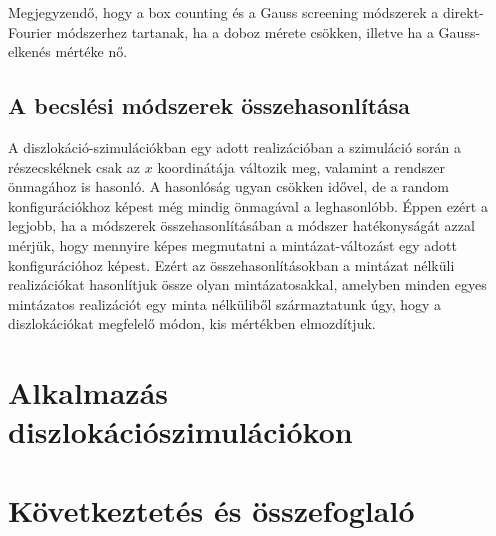 \documentclass[10pt,a4paper]{scrartcl}
\begin{document}
Megjegyzendő, hogy a box counting és a Gauss screening módszerek a direkt-Fourier módszerhez tartanak, ha a doboz mérete csökken, illetve ha a Gauss-elkenés mértéke nő.

\subsection{A becslési módszerek összehasonlítása}
A diszlokáció-szimulációkban egy adott realizációban a szimuláció során a részecskéknek csak az $x$ koordinátája változik meg, valamint a rendszer önmagához is hasonló. A hasonlóság ugyan csökken idővel, de a random konfigurációkhoz képest még mindig önmagával a leghasonlóbb. Éppen ezért a legjobb, ha a módszerek összehasonlításában a módszer hatékonyságát azzal mérjük, hogy mennyire képes megmutatni a mintázat-változást egy adott konfigurációhoz képest. Ezért az összehasonlításokban a mintázat nélküli realizációkat hasonlítjuk össze olyan mintázatosakkal, amelyben minden egyes mintázatos realizációt egy minta nélküliből származtatunk úgy, hogy a diszlokációkat megfelelő módon, kis mértékben elmozdítjuk.

\section{Alkalmazás diszlokációszimulációkon}

\section{Következtetés és összefoglaló}
\end{document}
